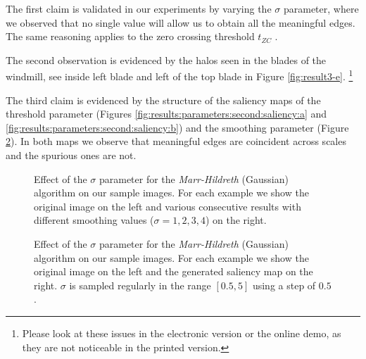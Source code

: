 \documentclass{ipol}
\numberwithin{equation}{section}
\numberwithin{table}{section}
\begin{document}
The first claim is validated in our experiments by varying the $\sigma$ parameter, where we observed that no single value will allow us to obtain all the meaningful edges. The same reasoning applies to the zero crossing threshold $t_{ZC}$ .

The second observation is evidenced by the halos seen in the blades of the windmill, see inside left blade and left of the top blade in Figure \ref{fig:result3-e}. \footnote{Please look at these issues in the electronic version or the online demo, as they are not noticeable in the printed version.}

The third claim is evidenced by the structure of the saliency maps of the threshold parameter (Figures \ref{fig:results:parameters:second:saliency:a} and \ref{fig:results:parameters:second:saliency:b}) and the smoothing parameter (Figure \ref{fig:results:parameters:marr:sigma:saliency}). In both maps we observe that meaningful edges are coincident across scales and the spurious ones are not.

\renewcommand{\anchocuatro}{3.6cm}
\begin{figure}[ht]
  \centering
{}
  \caption{Effect of the $\sigma$ parameter for the \textit{Marr-Hildreth} (Gaussian) algorithm on our sample images. For each example we show the original image on the left and various consecutive results with different smoothing values ($\sigma=1,2,3,4$) on the right.}
  \label{fig:results:parameters:marr:sigma}
\end{figure}

\renewcommand{\anchocuatro}{8cm}
\begin{figure}[ht]
  \centering
{}
  \caption{Effect of the $\sigma$ parameter for the \textit{Marr-Hildreth} (Gaussian) algorithm on our sample images. For each example we show the original image on the left and the generated saliency map  on the right.  $\sigma$ is sampled regularly in the range $[0.5,5]$ using a step of $0.5$.}
  \label{fig:results:parameters:marr:sigma:saliency}
\end{figure}
\end{document}
